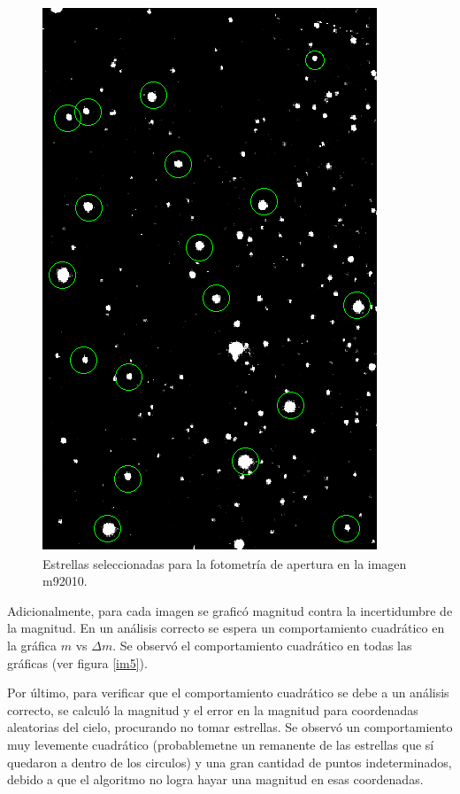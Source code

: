 \documentclass[12pt]{article}
\begin{document}
\begin{figure}[H]
\centering
   \includegraphics[scale=0.4]{imagenes.png}
  \caption{Estrellas seleccionadas para la fotometría de apertura en la imagen m92010.}
  \label{im4}
\end{figure}

Adicionalmente, para cada imagen se graficó magnitud contra la incertidumbre de la magnitud. En un análisis correcto se espera un comportamiento cuadrático en la gráfica $m$ vs $\Delta m $. Se observó el comportamiento cuadrático en todas las gráficas (ver figura \ref{im5}).


Por último, para verificar que el comportamiento cuadrático se debe a un análisis correcto, se calculó la magnitud y el error en la magnitud para coordenadas aleatorias del cielo, procurando no tomar estrellas. Se observó un comportamiento muy levemente cuadrático (probablemetne un remanente de las estrellas que sí quedaron a dentro de los circulos) y una gran cantidad de puntos indeterminados, debido a que el algoritmo no logra hayar una magnitud en esas coordenadas.
\end{document}
